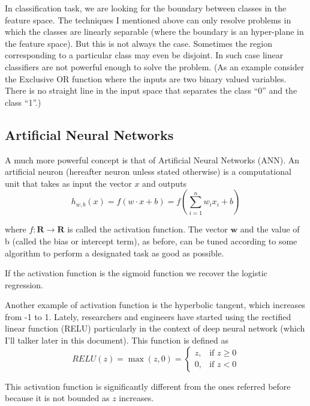 In classification task, we are looking for the boundary between classes in the feature space. The techniques I mentioned above can only resolve problems in which the classes are linearly separable (where the boundary is an hyper-plane in the feature space). But this is not always the case. Sometimes the region corresponding to a particular class may even be disjoint. In such case linear classifiers are not powerful enough to solve the problem. (As an example consider the Exclusive OR function where the inputs are two binary valued variables. There is no straight line in the input space that separates the class “0” and the class “1”.)

\subsection{Artificial Neural Networks}
\label{subsec:ANN}

A much more powerful concept is that of Artificial Neural Networks (ANN). 
An artificial neuron (hereafter neuron unless stated otherwise) is a computational unit that takes as input the vector $x$ and outputs
\begin{equation}
h_{w,b} (x) = f\left( w \cdot x + b \right) = f \left( \sum_{i=1}^n w_i x_i + b  \right)
\end{equation}

\noindent
where $f\colon \textbf{R} \rightarrow \textbf{R}$ is called the activation function. The vector $\textbf{w}$ and the value of b (called the bias or intercept term), as before, can be tuned according to some algorithm to perform a designated task as good as possible. 

If the activation function is the sigmoid function we recover the logistic regression.

Another example of activation function is the hyperbolic tangent, which increases from -1 to 1. 
Lately, researchers and engineers have started using the rectified linear function (RELU) particularly in the context of deep neural network (which I'll talker later in this document). This function is defined as
\begin{equation}
RELU(z)= \max(z,0) = 
\begin{cases}
    z,& \text{if } z\geq 0\\
    0,              & \text{if } z < 0
\end{cases}
\end{equation}

This activation function is significantly different from the ones referred before because it is not bounded as $z$ increases. %


